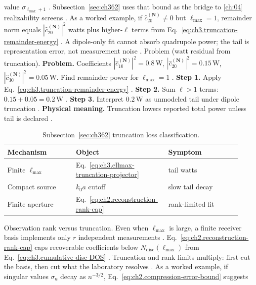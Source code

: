 value \(\sigma_{\ell_{\max}+1}\) \cite{harrington2001}. Subsection~\ref{sec:ch362} uses that bound as the bridge to
\ref{ch:04} realizability screens \cite{harrington2001}.
As a worked example, if \(\widehat{c}_{20}^{(\mathbf{N})}\neq0\) but \(\ell_{\max}=1\), remainder norm equals
\(|\widehat{c}_{20}^{(\mathbf{N})}|^{2}\) watts plus higher-\(\ell\) terms from
Eq.~\eqref{eq:ch3.truncation-remainder-energy} \cite{poynting1884}. A dipole-only fit cannot absorb
quadrupole power; the tail is representation error, not measurement noise \cite{stratton1941}.
Problem (watt residual from truncation). \textbf{Problem.} Coefficients \(|\widehat{c}_{10}^{(\mathbf{N})}|^{2}=0.8\,\mathrm{W}\),
\(|\widehat{c}_{20}^{(\mathbf{N})}|^{2}=0.15\,\mathrm{W}\), \(|\widehat{c}_{30}^{(\mathbf{N})}|^{2}=0.05\,\mathrm{W}\).
Find remainder power for \(\ell_{\max}=1\) \cite{harrington2001}.
\textbf{Step 1.} Apply Eq.~\eqref{eq:ch3.truncation-remainder-energy} \cite{hansen1988}.
\textbf{Step 2.} Sum \(\ell>1\) terms: \(0.15+0.05=0.2\,\mathrm{W}\) \cite{poynting1884}.
\textbf{Step 3.} Interpret \(0.2\,\mathrm{W}\) as unmodeled tail under dipole truncation \cite{harrington2001}.
\textbf{Physical meaning.} Truncation lowers reported total power unless tail is declared \cite{stratton1941}.
\begin{table}[t]
\centering
\caption{Subsection~\ref{sec:ch362} truncation loss classification.}
\label{tab:ch3.362-truncation-taxonomy}
\small
\begin{tabular}{@{}p{0.28\linewidth}p{0.36\linewidth}p{0.30\linewidth}@{}}
\toprule
Mechanism & Object & Symptom \\
\midrule
Finite \(\ell_{\max}\) & Eq.~\eqref{eq:ch3.ellmax-truncation-projector} & tail watts \\
Compact source & \(k_{0}a\) cutoff & slow tail decay \\
Finite aperture & Eq.~\eqref{eq:ch2.reconstruction-rank-cap} & rank-limited fit \\
\bottomrule
\end{tabular}
\end{table}
Observation rank versus truncation. Even when \(\ell_{\max}\) is large, a finite receiver basis implements only \(r\) independent measurements
\cite{harrington2001}. Eq.~\eqref{eq:ch2.reconstruction-rank-cap} caps recoverable coefficients below
\(N_{\mathrm{disc}}(\ell_{\max})\) from Eq.~\eqref{eq:ch3.cumulative-disc-DOS} \cite{harrington2001}. Truncation and
rank limits multiply: first cut the basis, then cut what the laboratory resolves \cite{stratton1941}.
As a worked example, if singular values \(\sigma_{n}\) decay as \(n^{-3/2}\), Eq.~\eqref{eq:ch2.compression-error-bound} suggests
